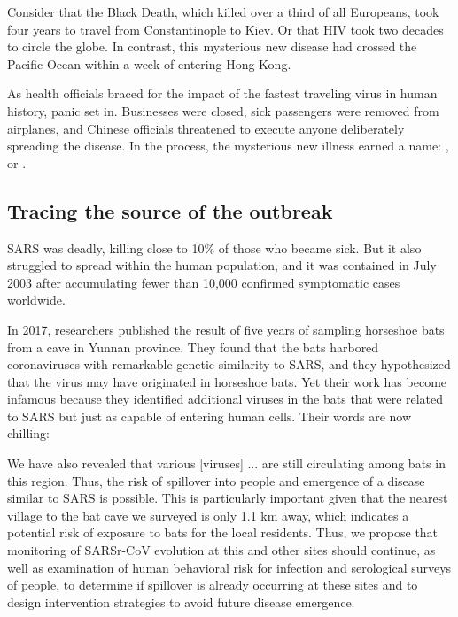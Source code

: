 Consider that the Black Death, which killed over a third of all Europeans, took four years to travel from Constantinople to Kiev. Or that HIV took two decades to circle the globe. In contrast, this mysterious new disease had crossed the Pacific Ocean within a week of entering Hong Kong.

As health officials braced for the impact of the fastest traveling virus in human history, panic set in. Businesses were closed, sick passengers were removed from airplanes, and Chinese officials threatened to execute anyone deliberately spreading the disease. In the process, the mysterious new illness earned a name: , or .

\FloatBarrier
{}
\subsection{Tracing the source of the outbreak}

SARS was deadly, killing close to 10\% of those who became sick. But it also struggled to spread within the human population, and it was contained in July 2003 after accumulating fewer than 10,000 confirmed symptomatic cases worldwide.

In 2017, researchers published the result of five years of sampling horseshoe bats from a cave in Yunnan province. They found that the bats harbored coronaviruses with remarkable genetic similarity to SARS, and they hypothesized that the virus may have originated in horseshoe bats. Yet their work has become infamous because they identified additional viruses in the bats that were related to SARS but just as capable of entering human cells. Their words are now chilling:

\begin{itquote}
We have also revealed that various [viruses] ... are still circulating among bats in this region. Thus, the risk of spillover into people and emergence of a disease similar to SARS is possible. This is particularly important given that the nearest village to the bat cave we surveyed is only 1.1 km away, which indicates a potential risk of exposure to bats for the local residents. Thus, we propose that monitoring of SARSr-CoV evolution at this and other sites should continue, as well as examination of human behavioral risk for infection and serological surveys of people, to determine if spillover is already occurring at these sites and to design intervention strategies to avoid future disease emergence.
\end{itquote}

